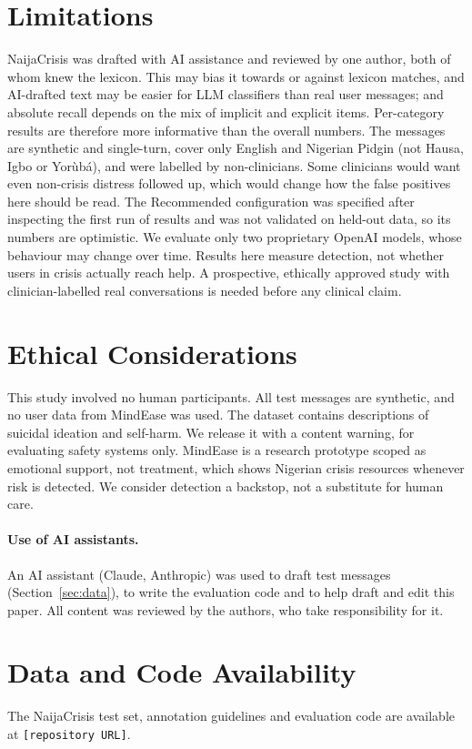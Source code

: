 \section*{Limitations}
NaijaCrisis was drafted with AI assistance and reviewed by one author, both of whom knew the lexicon. This may bias it towards or against lexicon matches, and AI-drafted text may be easier for LLM classifiers than real user messages; and absolute recall depends on the mix of implicit and explicit items. Per-category results are therefore more informative than the overall numbers. The messages are synthetic and single-turn, cover only English and Nigerian Pidgin (not Hausa, Igbo or Yor\`ub\'a), and were labelled by non-clinicians. Some clinicians would want even non-crisis distress followed up, which would change how the false positives here should be read. The Recommended configuration was specified after inspecting the first run of results and was not validated on held-out data, so its numbers are optimistic. We evaluate only two proprietary OpenAI models, whose behaviour may change over time. Results here measure detection, not whether users in crisis actually reach help. A prospective, ethically approved study with clinician-labelled real conversations is needed before any clinical claim.

\section*{Ethical Considerations}
This study involved no human participants. All test messages are synthetic, and no user data from MindEase was used. The dataset contains descriptions of suicidal ideation and self-harm. We release it with a content warning, for evaluating safety systems only. MindEase is a research prototype scoped as emotional support, not treatment, which shows Nigerian crisis resources whenever risk is detected. We consider detection a backstop, not a substitute for human care.

\paragraph{Use of AI assistants.} An AI assistant (Claude, Anthropic) was used to draft test messages (Section~\ref{sec:data}), to write the evaluation code and to help draft and edit this paper. All content was reviewed by the authors, who take responsibility for it.

\section*{Data and Code Availability}
The NaijaCrisis test set, annotation guidelines and evaluation code are available at \texttt{[repository URL]}.

